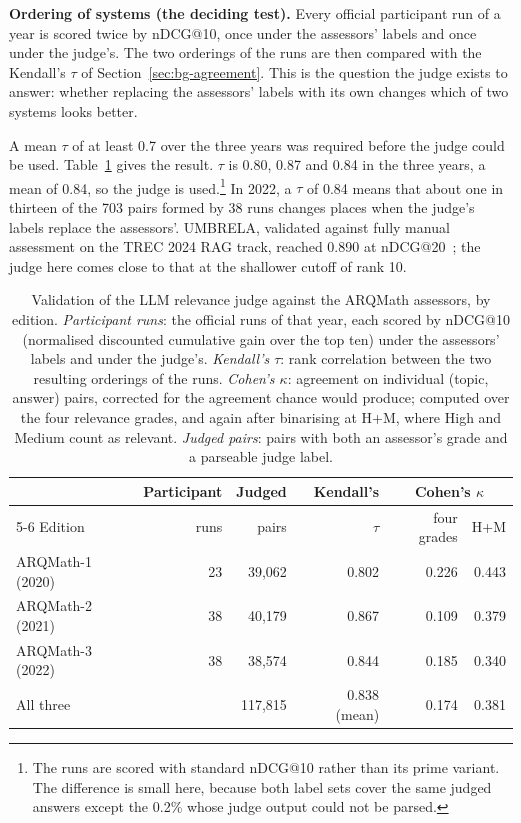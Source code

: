 \textbf{Ordering of systems (the deciding test).} Every official participant run of a
year is scored twice by nDCG@10, once under the assessors' labels and once under the
judge's. The two orderings of the runs are then compared with the Kendall's $\tau$ of
Section~\ref{sec:bg-agreement}. This is the question the judge exists to answer:
whether replacing the assessors' labels with its own changes which of two systems
looks better.

A mean $\tau$ of at least 0.7 over the three years was required before the judge
could be used.
Table~\ref{tab:met-judge-years} gives the result. $\tau$ is 0.80, 0.87 and 0.84 in
the three years, a mean of 0.84, so the judge is used.\footnote{The runs are scored
with standard nDCG@10 rather than its prime variant. The difference is small here,
because both label sets cover the same judged answers except the 0.2\% whose judge
output could not be parsed.} In 2022, a $\tau$ of 0.84 means that about one in
thirteen of the 703 pairs formed by 38 runs changes places when the judge's labels
replace the assessors'. UMBRELA, validated against fully manual assessment on the
TREC 2024 RAG track, reached 0.890 at nDCG@20~\cite{upadhyay2025umbrela}; the judge
here comes close to that at the shallower cutoff of rank 10.

\begin{table}[t]
\centering
\small
\renewcommand{\arraystretch}{1.15}
\begin{tabular}{lrrrrr}
\toprule
& Participant & Judged & Kendall's & \multicolumn{2}{c}{Cohen's $\kappa$} \\
\cmidrule(lr){5-6}
Edition & runs & pairs & $\tau$ & four grades & H+M \\
\midrule
ARQMath-1 (2020) & 23 & 39{,}062 & 0.802 & 0.226 & 0.443 \\
ARQMath-2 (2021) & 38 & 40{,}179 & 0.867 & 0.109 & 0.379 \\
ARQMath-3 (2022) & 38 & 38{,}574 & 0.844 & 0.185 & 0.340 \\
\midrule
All three        &    & 117{,}815 & 0.838 (mean) & 0.174 & 0.381 \\
\bottomrule
\end{tabular}
\caption[Validation of the relevance judge, by edition]{Validation of the LLM relevance judge against the ARQMath assessors, by
edition. \emph{Participant runs}: the official runs of that year, each scored by
nDCG@10 (normalised discounted cumulative gain over the top ten) under the assessors'
labels and under the judge's. \emph{Kendall's $\tau$}: rank correlation between the
two resulting orderings of the runs. \emph{Cohen's $\kappa$}: agreement on individual
(topic, answer) pairs, corrected for the agreement chance would produce; computed over
the four relevance grades, and again after binarising at H+M, where High and Medium
count as relevant. \emph{Judged pairs}: pairs with both an assessor's grade and a
parseable judge label.}
\label{tab:met-judge-years}
\end{table}

